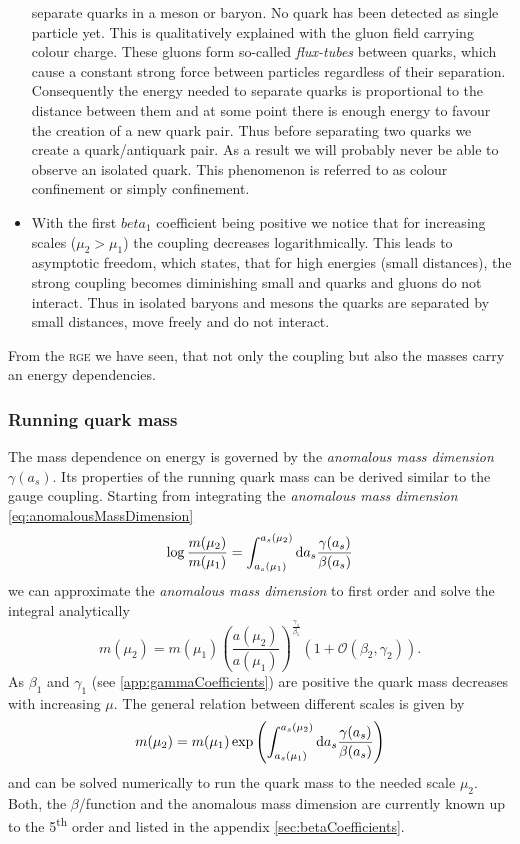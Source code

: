 \documentclass[../../index.tex]{subfiles}
\begin{document}
\begin{itemize}
  separate quarks in a meson or baryon. No quark has been detected as single
  particle yet. This is qualitatively explained with the gluon field carrying
  colour charge. These gluons form so-called \textit{flux-tubes} between quarks,
  which cause a constant strong force between particles regardless of their
  separation. Consequently the energy needed to separate quarks is proportional
  to the distance between them and at some point there is enough energy to
  favour the creation of a new quark pair. Thus before separating two quarks we
  create a quark\-/antiquark pair. As a result we will probably never be able to
  observe an isolated quark. This phenomenon is referred to as colour
  confinement or simply confinement.
\item With the first \(beta_1\) coefficient being positive we notice that for
  increasing scales (\(\mu_2>\mu_1\)) the coupling decreases logarithmically.
  This leads to asymptotic freedom, which states, that for high energies (small
  distances), the strong coupling becomes diminishing small and quarks and
  gluons do not interact. Thus in isolated baryons and mesons the quarks are
  separated by small distances, move freely and do not interact. \end{itemize}

From the \textsc{rge} we have seen, that not only the coupling but also the
masses carry an energy dependencies.

\subsubsection{Running quark mass}
The mass dependence on energy is governed by the \textit{anomalous mass
  dimension} $\gamma(a_s)$. Its properties of the running quark mass can be
derived similar to the gauge coupling. Starting from integrating the
\textit{anomalous mass dimension} \cref{eq:anomalousMassDimension}
\begin{equation}
  \log \frac{m(\mu_2)}{m(\mu_1)} = \int_{a_s(\mu_1)}^{a_s(\mu_2)} \dif a_s \frac{\gamma(a_s)}{\beta(a_s)}
\end{equation}
we can approximate the \textit{anomalous mass dimension} to first order and
solve the integral analytically \cite{Schwab2002}
\begin{equation}
  m(\mu_2) = m(\mu_1)\left( \frac{a(\mu_2)}{a(\mu_1)} \right)^{\frac{\gamma_1}{\beta_1}} \left( 1 + \mathcal{O}(\beta_2, \gamma_2) \right).
\end{equation}
As $\beta_1$ and $\gamma_1$ (see \ref{app:gammaCoefficients}) are positive the
quark mass decreases with increasing $\mu$. The general relation between
different scales is given by
\begin{equation}
  m(\mu_2) = m(\mu_1) \exp \left( \int_{a_s(\mu_1)}^{a_s(\mu_2)} \dif a_s \frac{\gamma(a_s)}{\beta(a_s)}  \right)
\end{equation}
and can be solved numerically to run the quark mass to the needed scale $\mu_2$.
Both, the \(\beta\)\-/function and the anomalous mass dimension are currently
known up to the 5\textsuperscript{th} order and listed in the appendix
\ref{sec:betaCoefficients}.
\end{document}

